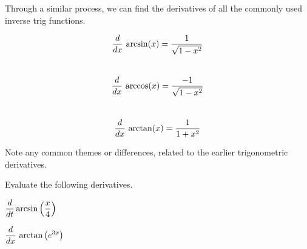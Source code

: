 \newpage

Through a similar process, we can find the derivatives of all the
commonly used inverse trig functions.
\begin{boxnote}
$$ \displaystyle \frac{d}{dx} \, \arcsin( x) = \frac{1}{\sqrt{1-x^2}}$$ \\
$$ \displaystyle \frac{d}{dx} \, \arccos( x) = \frac{-1}{\sqrt{1-x^2}}$$ \\
$$ \displaystyle \frac{d}{dx} \, \arctan(x) = \frac{1}{1+x^2}$$
\end{boxnote}
\problem Note any common themes or differences, related to the earlier
trigonometric derivatives.

\newpage

\problem Evaluate the following derivatives.

$\displaystyle \frac{d{}}{dt} \arcsin\left(\frac{x}{4}\right)$

\vfill

$\displaystyle \frac{d}{dx} \,{} \arctan\left(e^{3x} \right)$

\vfill

  

